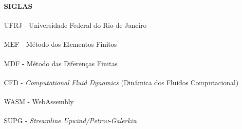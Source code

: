 \pagebreak


\begin{center}
\textbf{SIGLAS}
\end{center}
      \vspace{0.5cm}

\paragraph{}UFRJ - Universidade Federal do Rio de Janeiro
\paragraph{}MEF - Método dos Elementos Finitos
\paragraph{}MDF - Método das Diferenças Finitas
\paragraph{}CFD - \textit{Computational Fluid Dynamics} (Dinâmica dos Fluidos Computacional)
\paragraph{}WASM - WebAssembly
\paragraph{}SUPG - \textit{Streamline Upwind/Petrov-Galerkin}


\pagebreak






